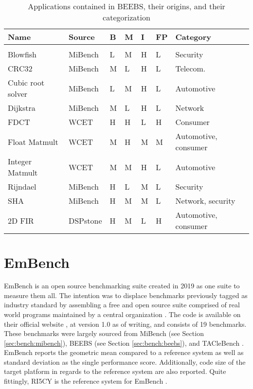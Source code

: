 \documentclass[../bachelor_paper.tex]{subfiles}
\begin{document}
\begin{table}
    \centering
    \begin{tabular}{lllllll}
    \textbf{Name}   & \textbf{Source}   & \textbf{B} & \textbf{M} & \textbf{I} & \textbf{FP}    & \textbf{Category} \\
    \hline\\[-0.9em]
    Blowfish        & MiBench   & L & M & H & L & Security \\
    CRC32           & MiBench   & M & L & H & L & Telecom. \\
    Cubic root solver & MiBench & L & M & H & L & Automotive \\
    Dijkstra        & MiBench   & M & L & H & L & Network  \\
    FDCT            & WCET      & H & H & L & H & Consumer \\
    Float Matmult   & WCET      & M & H & M & M & Automotive, consumer \\
    Integer Matmult & WCET      & M & M & H & L & Automotive \\
    Rijndael        & MiBench   & H & L & M & L & Security \\
    SHA             & MiBench   & H & M & M & L & Network, security \\
    2D FIR          & DSPstone  & H & M & L & H & Automotive, consumer \\
    \hline
    \end{tabular}
    \caption{Applications contained in BEEBS, their origins, and their categorization \cite{pallisterBEEBSOpenBenchmarks2013}}
    \label{tab:bench/beebs/apps}
\end{table}

\section{EmBench}
EmBench is an open source benchmarking suite created in 2019 as one suite to measure them all. The intention was to displace benchmarks previously tagged as industry standard by assembling a free and open source suite comprised of real world programs maintained by a central organization \cite{jun11EmbenchRecruitingLong2019}. The code is available on their official website \cite{EmbenchModernEmbedded}, at version 1.0 as of writing, and consists of 19 benchmarks. These benchmarks were largely sourced from MiBench \cite{guthausMiBenchFreeCommercially2001} (see Section \ref{sec:bench:mibench}), BEEBS \cite{pallisterBEEBSOpenBenchmarks2013} (see Section \ref{sec:bench:beebs}), and TACleBench \cite{falkTACLeBenchBenchmarkCollection2016}. EmBench reports the geometric mean compared to a reference system as well as standard deviation as the single performance score. Additionally, code size of the target platform in regards to the reference system are also reported. Quite fittingly, RI5CY is the reference system for EmBench \cite{jun11EmbenchRecruitingLong2019}.
\end{document}
